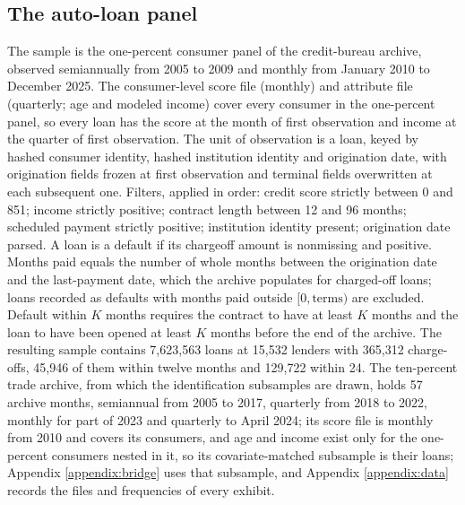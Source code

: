 \documentclass[12pt,english]{article}
\begin{document}
\subsection{The auto-loan panel}

\begin{table}[H]
    \caption{The auto-loan analysis sample: quartiles of the key variables}
    \label{tab:loan_summary}
    \begin{center}
    \vspace{-1em}
    
\end{center}
\end{table}


The sample is the one-percent consumer panel of the credit-bureau archive, observed semiannually from 2005 to 2009 and monthly from January 2010 to December 2025. The consumer-level score file (monthly) and attribute file (quarterly; age and modeled income) cover every consumer in the one-percent panel, so every loan has the score at the month of first observation and income at the quarter of first observation. The unit of observation is a loan, keyed by hashed consumer identity, hashed institution identity and origination date, with origination fields frozen at first observation and terminal fields overwritten at each subsequent one. Filters, applied in order: credit score strictly between 0 and 851; income strictly positive; contract length between 12 and 96 months; scheduled payment strictly positive; institution identity present; origination date parsed. A loan is a default if its chargeoff amount is nonmissing and positive. Months paid equals the number of whole months between the origination date and the last-payment date, which the archive populates for charged-off loans; loans recorded as defaults with months paid outside $[0, \text{terms})$ are excluded. Default within $K$ months requires the contract to have at least $K$ months and the loan to have been opened at least $K$ months before the end of the archive. The resulting sample contains 7{,}623{,}563 loans at 15{,}532 lenders with 365{,}312 charge-offs, 45{,}946 of them within twelve months and 129{,}722 within 24. The ten-percent trade archive, from which the identification subsamples are drawn, holds 57 archive months, semiannual from 2005 to 2017, quarterly from 2018 to 2022, monthly for part of 2023 and quarterly to April 2024; its score file is monthly from 2010 and covers its consumers, and age and income exist only for the one-percent consumers nested in it, so its covariate-matched subsample is their loans; Appendix \ref{appendix:bridge} uses that subsample, and Appendix \ref{appendix:data} records the files and frequencies of every exhibit.
\end{document}
